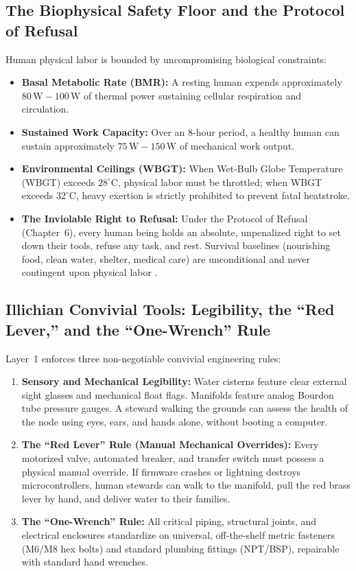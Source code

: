 \subsection{The Biophysical Safety Floor and the Protocol of Refusal}

Human physical labor is bounded by uncompromising biological constraints:
\begin{itemize}
    \item \textbf{Basal Metabolic Rate (BMR):} A resting human expends approximately $80\,\mathrm{W}-100\,\mathrm{W}$ of thermal power sustaining cellular respiration and circulation.
    \item \textbf{Sustained Work Capacity:} Over an 8-hour period, a healthy human can sustain approximately $75\,\mathrm{W}-150\,\mathrm{W}$ of mechanical work output.
    \item \textbf{Environmental Ceilings (WBGT):} When Wet-Bulb Globe Temperature (WBGT) exceeds $28^\circ\mathrm{C}$, physical labor must be throttled; when WBGT exceeds $32^\circ\mathrm{C}$, heavy exertion is strictly prohibited to prevent fatal heatstroke.
    \item \textbf{The Inviolable Right to Refusal:} Under the Protocol of Refusal (Chapter~6), every human being holds an absolute, unpenalized right to set down their tools, refuse any task, and rest. Survival baselines (nourishing food, clean water, shelter, medical care) are unconditional and never contingent upon physical labor \parencite{han2015}.
\end{itemize}

\subsection{Illichian Convivial Tools: Legibility, the ``Red Lever,'' and the ``One-Wrench'' Rule}

Layer~1 enforces three non-negotiable convivial engineering rules:
\begin{enumerate}
    \item \textbf{Sensory and Mechanical Legibility:} Water cisterns feature clear external sight glasses and mechanical float flags. Manifolds feature analog Bourdon tube pressure gauges. A steward walking the grounds can assess the health of the node using eyes, ears, and hands alone, without booting a computer.
    \item \textbf{The ``Red Lever'' Rule (Manual Mechanical Overrides):} Every motorized valve, automated breaker, and transfer switch must possess a physical manual override. If firmware crashes or lightning destroys microcontrollers, human stewards can walk to the manifold, pull the red brass lever by hand, and deliver water to their families.
    \item \textbf{The ``One-Wrench'' Rule:} All critical piping, structural joints, and electrical enclosures standardize on universal, off-the-shelf metric fasteners (M6/M8 hex bolts) and standard plumbing fittings (NPT/BSP), repairable with standard hand wrenches.
\end{enumerate}

